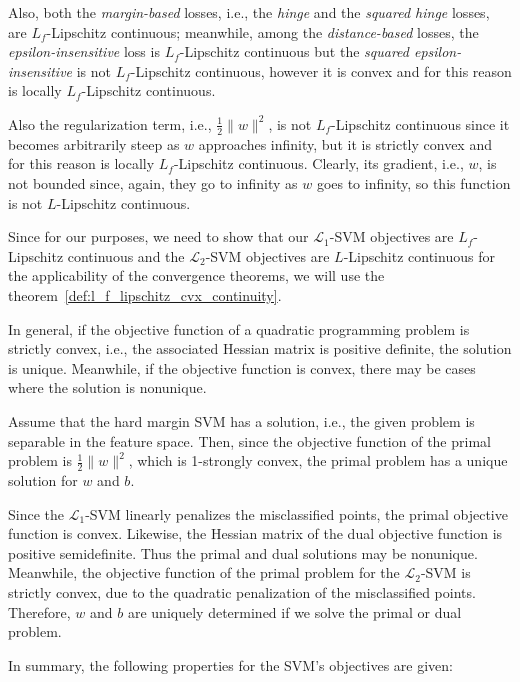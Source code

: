 Also, both the \emph{margin-based} losses, i.e., the \emph{hinge} and the \emph{squared hinge} losses, are $L_f$-Lipschitz continuous; meanwhile, among the \emph{distance-based} losses, the \emph{epsilon-insensitive} loss is $L_f$-Lipschitz continuous but the \emph{squared epsilon-insensitive} is not $L_f$-Lipschitz continuous, however it is convex and for this reason is locally $L_f$-Lipschitz continuous. 

Also the regularization term, i.e., $\displaystyle \frac{1}{2} \| w \|^2$, is not $L_f$-Lipschitz continuous since it becomes arbitrarily steep as $w$ approaches infinity, but it is strictly convex and for this reason is locally $L_f$-Lipschitz continuous. Clearly, its gradient, i.e., $w$, is not bounded since, again, they go to infinity as $w$ goes to infinity, so this function is not $L$-Lipschitz continuous.

Since for our purposes, we need to show that our $\mathcal{L}_1$-SVM objectives are $L_f$-Lipschitz continuous and the $\mathcal{L}_2$-SVM objectives are $L$-Lipschitz continuous for the applicability of the convergence theorems, we will use the theorem~\ref{def:l_f_lipschitz_cvx_continuity}.

In general, if the objective function of a quadratic programming problem is strictly convex, i.e., the associated Hessian matrix is positive definite, the solution is unique. Meanwhile, if the objective function is convex, there may be cases where the solution is nonunique.

Assume that the hard margin SVM has a solution, i.e., the given problem is separable in the feature space. Then, since the objective function of the primal problem is $\displaystyle \frac{1}{2} \| w \|^2$, which is 1-strongly convex, the primal problem has a unique solution for $w$ and $b$.

Since the $\mathcal{L}_1$-SVM linearly penalizes the misclassified points, the primal objective function is convex. Likewise, the Hessian matrix of the dual objective function is positive semidefinite. Thus the primal and dual solutions may be nonunique. Meanwhile, the objective function of the primal problem for the $\mathcal{L}_2$-SVM is strictly convex, due to the quadratic penalization of the misclassified points. Therefore, $w$ and $b$ are uniquely determined if we solve the primal or dual problem. 

In summary, the following properties for the SVM's objectives are given:


